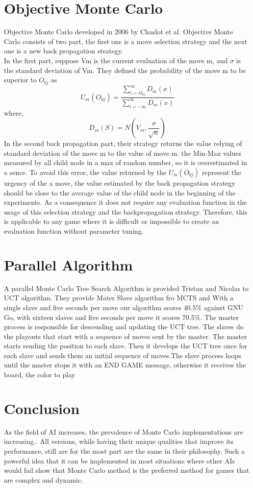 \documentclass[11pt]{article}
\begin{document}
\section{Objective Monte Carlo}
Objective Monte Carlo developed in 2006 by Chaslot et al\cite{chaslot2006monte}. Objective Monte Carlo consists of two part, the first one is a move selection strategy and the next one is a new back propagation strategy. \\
In the first part, suppose Vm is the current evaluation of the move m, and \(\sigma\) is the standard deviation of Vm. They defined the probability of the move m to be superior to \(O_{bj}\) as 
\[U_{m}(O_{bj}) = \frac{\sum_{i=O_{bj}}^{\infty} D_{m}(x)}{\sum_{i=-\infty}^{\infty} D_{m}(x)}\]
where, \[D_{m}(S) = N(V_{m}, \frac{\sigma}{\sqrt n}) \]
In the second back propagation part, their strategy returns the value relying of standard deviation of the move m to the value of move m. the Min-Max values measured by all child node in a max of random number, so it is overestimated in a sence. To avoid this error, the value returned by the 
\(U_{m}(O_{bj})\) represent the urgency of the a move, the value estimated by the back propagation strategy should be close to the average value of the child node in the beginning of the experiments.
As a consequence it does not require any evaluation function in the usage of this selection strategy and the backpropagation strategy. Therefore, this is applicable to any game where it is difficult or impossible  to create an evaluation function without parameter tuning.
\section{Parallel Algorithm}
A parallel Monte Carlo Tree Search Algorithm is provided Tristan and Nicolas to UCT algorithm\cite{cazenave2008parallel}. They provide Mater Slave algorithm fro MCTS and With a single slave and five seconds per move our algorithm scores 40.5\% against GNU Go, with sixteen slaves and five seconds per move it scores 70.5\%. The master process is responsible for descending and updating the UCT tree. The slaves do the playouts  that start with a sequence of moves sent by the master. The master starts sending the position to each slave. Then it develops the UCT tree once for each slave and sends them an initial sequence of moves.The slave process loops until the master stops it with an END GAME message, otherwise it receives the board, the color to play

\section{Conclusion}

As the field of AI increases, the prevalence of Monte Carlo implementations are increasing.. All versions, while having their unique qualities that improve its performance, still are for the most part are the same in their philosophy. Such a powerful idea that it can be implemented in most situations where other AIs would fail show that Monte Carlo method is the preferred method for games that are complex and dynamic. 





\end{document}
